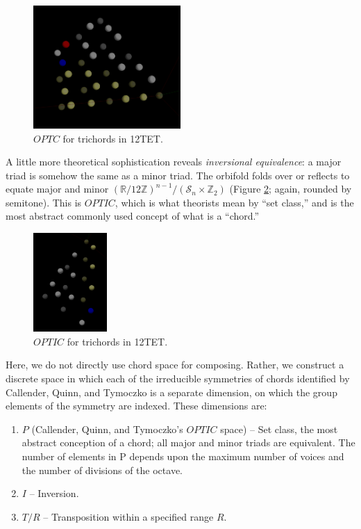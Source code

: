 \documentclass[english,11pt,letterpaper,onecolumn]{scrartcl}
\numberwithin{equation}{section}
\begin{document}
\begin{figure}
\centerline{\includegraphics[width = 0.5\textwidth]{opttc}}
\caption{\label{fig:opttc}
  $OPTC$ for trichords in 12TET.}
\end{figure}

A little more theoretical sophistication reveals \textit{inversional
equivalence}: a major triad is somehow the same as a minor triad. The orbifold
folds over or reflects to equate major and minor
$\left(\mathbb{R}/12\mathbb{Z}\right)^{n-1}/(\mathcal{S}_{n} \times
\mathbb{Z}_{2})$ (Figure \ref{fig:optic}; again, rounded by semitone). This is
$OPTIC$, which is what theorists mean by ``set class,'' and is the most abstract
commonly used concept of what is a ``chord.''

\begin{figure}
\centerline{\includegraphics[width = 0.25\textwidth]{opttic}}
\caption{\label{fig:optic}
  $OPTIC$ for trichords in 12TET.}
\end{figure}

Here, we do not directly use chord space for composing. Rather, we construct a
discrete space in which each of the irreducible symmetries of chords identified
by Callender, Quinn, and Tymoczko is a separate dimension, on which the group
elements of the symmetry are indexed. These dimensions are:

\begin{enumerate}
\item $P$ (Callender, Quinn, and Tymoczko's $OPTIC$ space) -- Set class, the
most abstract conception of a chord; all major and minor triads are equivalent.
The number of elements in P depends upon the maximum number of voices and the
number of divisions of the octave.
\item $I$ -- Inversion.
\item $T/R$ -- Transposition within a specified range $R$.
\end{enumerate}
\end{document}
